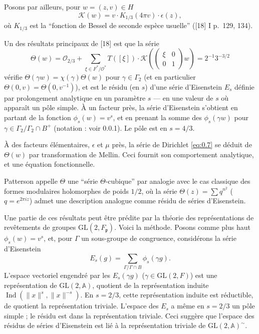 \documentclass[12pt,a4paper]{article}
\theoremstyle{plain}
\theoremstyle{definition}
\theoremstyle{remark}
\DeclareMathOperator{\Ind}{Ind}
\newcommand{\Af}{\mathbb{A}}
\newcommand{\cO}{\mathcal{O}}
\newcommand{\frakp}{\mathfrak{p}}
\providecommand{\cO}{\mathcal{O}}
\providecommand{\frakp}{\mathfrak{p}}
\begin{document}
Posons par ailleurs, pour $w = (z, v) \in H$
\[
\mathcal{K}(w) = v \cdot K_{1/3}(4\pi v) \cdot \epsilon(z),
\]
où $K_{1/3}$ est la ``fonction de Bessel de seconde espèce usuelle'' ([18] I p.~129, 134).

Un des résultats principaux de [18] est que la série
\begin{equation}\label{eq:0.11}
\Theta(w) = \mathcal{O}_{2/3} + \sum_{\xi \in F^* / \cO^*} T([\xi]) \cdot \mathcal{K}\left(\begin{pmatrix} \xi & 0 \\ 0 & 1 \end{pmatrix} w\right) = 2^{-1} 3^{-3/2}
\tag{0.11}
\end{equation}
vérifie $\Theta(\gamma w) = \chi(\gamma) \Theta(w)$ pour $\gamma \in \Gamma_2$ (et en particulier $\Theta(0, v) = \Theta(0, v^{-1})$), et est le résidu (en $s$) d'une série d'Eisenstein $E_s$ définie par prolongement analytique en un paramètre $s$ --- en une valeur de $s$ où apparaît un pôle simple. À un facteur près, la série d'Eisenstein s'obtient en partant de la fonction $\phi_s(w) = v^s$, et en prenant la somme des $\phi_s(\gamma w)$ pour $\gamma \in \Gamma_2 / \Gamma_2 \cap B^+$ (notation : voir 0.0.1). Le pôle est en $s = 4/3$.

À des facteurs élémentaires, $\epsilon$ et $\mu$ près, la série de Dirichlet \eqref{eq:0.7} se déduit de $\Theta(w)$ par transformation de Mellin. Ceci fournit son comportement analytique, et une équation fonctionnelle.

Patterson appelle $\Theta$ une ``série $\Theta$-cubique'' par analogie avec le cas classique des formes modulaires holomorphes de poids $1/2$, où la série $\Theta(z) = \sum q^{n^2}$ ($q = e^{2\pi i z}$) admet une description analogue comme résidu de séries d'Eisenstein.

Une partie de ces résultats peut être prédite par la théorie des représentations de revêtements de groupes $\mathrm{GL}(2, F_\frakp)$. Voici la méthode. Posons comme plus haut $\phi_s(w) = v^s$, et, pour $\Gamma$ un sous-groupe de congruence, considérons la série d'Eisenstein
\[
E_s(g) = \sum_{\Gamma / \Gamma \cap B} \phi_s(\gamma g).
\]
L'espace vectoriel engendré par les $E_s(\gamma g)$ ($\gamma \in \mathrm{GL}(2, F)$) est une représentation de $\mathrm{GL}(2, \Af)$, quotient de la représentation induite $\Ind(\|x\|^s, \|x\|^{-s})$. En $s = 2/3$, cette représentation induite est réductible, de quotient la représentation triviale. L'espace des $E_s$ a même en $s = 2/3$ un pôle simple ; le résidu est dans la représentation triviale. Ceci suggère que l'espace des résidus de séries d'Eisenstein est lié à la représentation triviale de $\mathrm{GL}(2, \Af)^\sim$.
\end{document}
